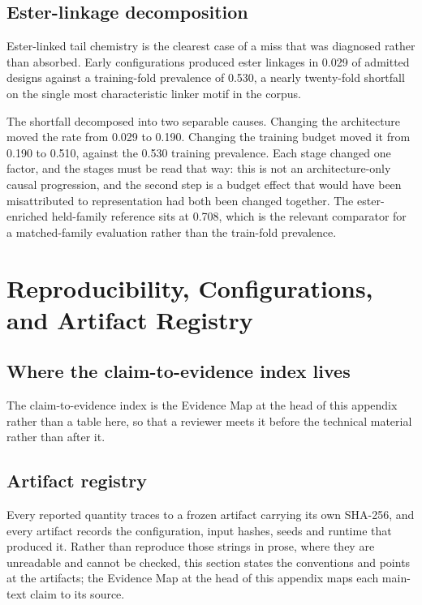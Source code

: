 \documentclass{article}
\newcommand{\EsterTrainFold}{0.530}           %
\newcommand{\EsterForge}{0.510}
\newcommand{\EsterMatchedRef}{0.708}          %
\begin{document}
\subsection{Ester-linkage decomposition}
\label{app:ester}
Ester-linked tail chemistry is the clearest case of a miss that was diagnosed rather than absorbed.
Early configurations produced ester linkages in 0.029 of admitted designs against a training-fold
prevalence of \EsterTrainFold{}, a nearly twenty-fold shortfall on the single most characteristic
linker motif in the corpus.

The shortfall decomposed into two separable causes. Changing the architecture moved the rate from
0.029 to 0.190. Changing the training budget moved it from 0.190 to \EsterForge{}, against the
\EsterTrainFold{} training prevalence. Each stage changed one factor, and the stages must be read
that way: this is not an architecture-only causal progression, and the second step is a
budget effect that would have been misattributed to representation had both been changed together. The
ester-enriched held-family reference sits at \EsterMatchedRef{}, which is the relevant comparator for
a matched-family evaluation rather than the train-fold prevalence.

\section{Reproducibility, Configurations, and Artifact Registry}
\label{app:reproducibility}

\subsection{Where the claim-to-evidence index lives}
\label{app:claim-index}
The claim-to-evidence index is the Evidence Map at the head of this appendix rather than a table
here, so that a reviewer meets it before the technical material rather than after it.

\subsection{Artifact registry}
\label{app:registry}
Every reported quantity traces to a frozen artifact carrying its own SHA-256, and every artifact
records the configuration, input hashes, seeds and runtime that produced it. Rather than reproduce
those strings in prose, where they are unreadable and cannot be checked, this section states the
conventions and points at the artifacts; the Evidence Map at the head of this appendix maps each
main-text claim to its source.
\end{document}
